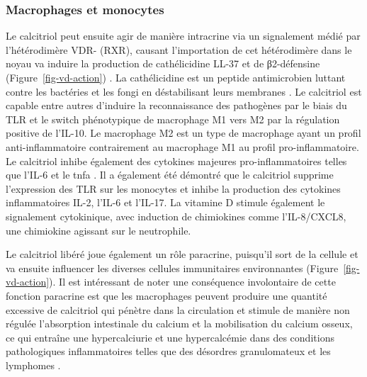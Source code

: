 \documentclass[
  a4paper,
  DIV=11,
  numbers=noendperiod,
  listof=totoc]{scrreprt}
\begin{document}
\subsubsection{Macrophages et monocytes}\label{macrophages-et-monocytes}

Le calcitriol peut ensuite agir de manière intracrine via un signalement
médié par l'hétérodimère \ac{VDR}- (\acl{RXR}), causant
l'importation de cet hétérodimère dans le noyau va induire la production
de cathélicidine LL-37 et de β2-défensine (Figure~\ref{fig-vd-action})
\autocite{Caprio.2017,Yasmin.2005}. La cathélicidine est un peptide
antimicrobien luttant contre les bactéries et les fongi en déstabilisant
leurs membranes \autocite{Charoenngam.2020}. Le calcitriol est capable
entre autres d'induire la reconnaissance des pathogènes par le biais du
\ac{TLR} et le switch phénotypique de macrophage M1 vers M2 par la
régulation positive de l'\ac{IL-10}. Le macrophage M2 est un type de
macrophage ayant un profil anti-inflammatoire contrairement au
macrophage M1 au profil pro-inflammatoire. Le calcitriol inhibe
également des cytokines majeures pro-inflammatoires telles que
l'\ac{IL-6} et le \ac{tnfa} \autocite{Meza-Meza.2022,Caprio.2017}. Il a
également été démontré que le calcitriol supprime l'expression des
\ac{TLR} sur les monocytes et inhibe la production des cytokines
inflammatoires \ac{IL-2}, l'\ac{IL-6} et l'\ac{IL-17}. La vitamine D
stimule également le signalement cytokinique, avec induction de
chimiokines comme l'IL-8/CXCL8, une chimiokine agissant sur le
neutrophile.

Le calcitriol libéré joue également un rôle paracrine, puisqu'il sort de
la cellule et va ensuite influencer les diverses cellules immunitaires
environnantes (Figure~\ref{fig-vd-action}). Il est intéressant de noter
une conséquence involontaire de cette fonction paracrine est que les
macrophages peuvent produire une quantité excessive de calcitriol qui
pénètre dans la circulation et stimule de manière non régulée
l'absorption intestinale du calcium et la mobilisation du calcium
osseux, ce qui entraîne une hypercalciurie et une hypercalcémie dans des
conditions pathologiques inflammatoires telles que des désordres
granulomateux et les lymphomes \autocite{Charoenngam.2020}.
\end{document}
